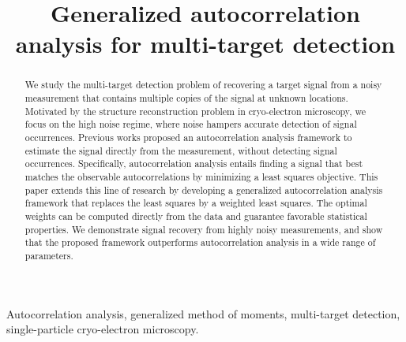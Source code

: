 \documentclass{article}
\title{Generalized autocorrelation analysis for multi-target detection}
\begin{document}
\ninept

\setlength{\abovedisplayskip}{3pt}
\setlength{\belowdisplayskip}{3pt}

%
\maketitle
%
\begin{abstract}
We study the multi-target detection problem of recovering a  target signal from a noisy measurement that contains multiple copies of the signal at unknown locations. Motivated by the structure reconstruction problem in cryo-electron microscopy, we focus on the high noise regime, where  noise hampers accurate detection of signal occurrences. Previous works  proposed an autocorrelation analysis framework to estimate the signal directly from the measurement, without detecting signal occurrences. Specifically,  autocorrelation analysis entails finding a signal that best matches the observable autocorrelations by minimizing a least squares objective.  This paper extends this line of research by developing a generalized autocorrelation analysis framework that replaces the least squares by a weighted least squares. The optimal weights can be computed directly from the data and guarantee favorable statistical properties. We demonstrate signal recovery from highly noisy measurements, and show that the proposed framework outperforms  autocorrelation analysis in a wide range of parameters.
\end{abstract}
%
\begin{keywords}
Autocorrelation analysis, generalized method of moments, multi-target detection, single-particle cryo-electron microscopy.
\end{keywords}
%
\end{document}
